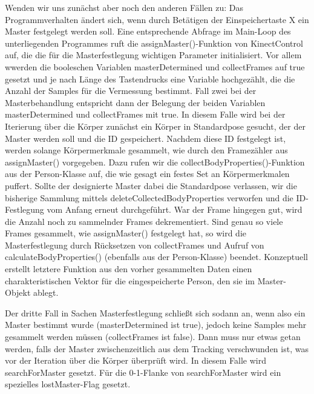 Wenden wir uns zunächst aber noch den anderen Fällen zu: Das Programmverhalten ändert sich, wenn durch Betätigen der Einspeichertaste X ein Master festgelegt werden soll. Eine entsprechende Abfrage im Main-Loop des unterliegenden Programmes ruft die assignMaster()-Funktion von KinectControl auf, die die für die Masterfestlegung wichtigen Parameter initialisiert. Vor allem wwerden die booleschen Variablen masterDetermined und collectFrames auf true gesetzt und je nach Länge des Tastendrucks eine Variable hochgezählt, die die Anzahl der Samples für die Vermessung bestimmt. Fall zwei bei der Masterbehandlung entspricht dann der Belegung der beiden Variablen masterDetermined und collectFrames mit true. In diesem Falle wird bei der Iterierung über die Körper zunächst ein Körper in Standardpose gesucht, der der Master werden soll und die ID gespeichert. Nachdem diese ID festgelegt ist, werden solange Körpermerkmale gesammelt, wie durch den Framezähler aus assignMaster() vorgegeben. Dazu rufen wir die collectBodyProperties()-Funktion aus der Person-Klasse auf, die wie gesagt ein festes Set an Körpermerkmalen puffert. Sollte der designierte Master dabei die Standardpose verlassen, wir die bisherige Sammlung mittels deleteCollectedBodyProperties verworfen und die ID-Festlegung vom Anfang erneut durchgeführt. War der Frame hingegen gut, wird die Anzahl noch zu sammelnder Frames dekrementiert. Sind genau so viele Frames gesammelt, wie assignMaster() festgelegt hat, so wird die Masterfestlegung durch Rücksetzen von collectFrames und Aufruf von calculateBodyProperties() (ebenfalls aus der Person-Klasse) beendet. Konzeptuell erstellt letztere Funktion aus den vorher gesammelten Daten einen charakteristischen Vektor für die eingespeicherte Person, den sie im Master-Objekt ablegt.\par 
Der dritte Fall in Sachen Masterfestlegung schließt sich sodann an, wenn also ein Master bestimmt wurde (masterDetermined ist true), jedoch keine Samples mehr gesammelt werden müssen (collectFrames ist false). Dann muss nur etwas getan werden, falls der Master zwischenzeitlich aus dem Tracking verschwunden ist, was vor der Iteration über die Körper überprüft wird. In diesem Falle wird searchForMaster gesetzt. Für die 0-1-Flanke von searchForMaster wird ein spezielles lostMaster-Flag gesetzt.
